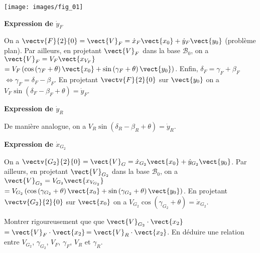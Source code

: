 \documentclass[11pt]{article}
\begin{document}
\begin{UPSTIcorrige}

\begin{center}
\texttt{[image: images/fig\_01]}
\end{center}
\textbf{Expression de $\dot{y}_F$}

On a  $\vectv{F}{2}{0}=\vect{V}_F = \dot{x}_F \vect{x_0} +\dot{y}_F \vect{y_0}$ (problème plan).  
Par ailleurs, en projetant $\vect{V}_F $ dans la base $\mathcal{B}_0$, on a $\vect{V}_F =V_F\vect{x_{V_F}}$ 
$=V_F\left(\cos\left(\gamma_F +\theta \right)\vect{x_0}+\sin\left(\gamma_F +\theta \right)\vect{y_0}\right)$. Enfin, $\delta_F=\gamma_F+\beta_F$ $\Leftrightarrow \gamma_F = \delta_F-\beta_F  $. 
En projetant  $\vectv{F}{2}{0}$ sur $\vect{y_0}$ on a $V_F\sin\left(\delta_F-\beta_F +\theta \right) = \dot{y}_F $.

\textbf{Expression de $\dot{y}_R$}

De manière analogue, on a $V_R \sin\left(\delta_R-\beta_R +\theta \right) = \dot{y}_R $.

\textbf{Expression de $\dot{x}_{G_2}$}

On a  $\vectv{G_2}{2}{0}=\vect{V}_G = \dot{x}_{G_2} \vect{x_0} +\dot{y}_{G_2} \vect{y_0}$.  
Par ailleurs, en projetant $\vect{V}_{G_2} $ dans la base $\mathcal{B}_0$, on a $\vect{V}_{G_2} =V_{G_2}\vect{x_{V_{G_2}}}$ 
$=V_{G_2}\left(\cos\left(\gamma_{G_2} +\theta \right)\vect{x_0}+\sin\left(\gamma_{G_2} +\theta \right)\vect{y_0}\right)$. 
En projetant  $\vectv{{G_2}}{2}{0}$ sur $\vect{x_0}$ on a $V_{G_2}\cos\left(\gamma_{G_2} +\theta \right) = \dot{x}_{G_2} $.


\end{UPSTIcorrige}



\UPSTIquestion Montrer rigoureusement que que $\vect{V}_{G_2}\cdot\vect{x_2}$ $=\vect{V}_{F}\cdot\vect{x_2}$$=\vect{V}_{R}\cdot\vect{x_2}$. En déduire une relation entre $V_{G_2}$, $\gamma_{G_2}$, $V_F$, $\gamma_F$, $V_R$ et $\gamma_R$. 
\end{document}

